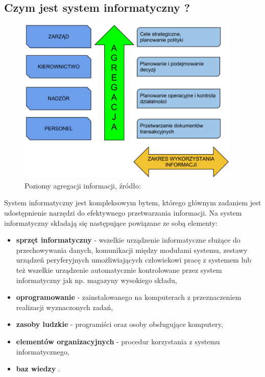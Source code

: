 	\subsection{Czym jest system informatyczny ?}
		\begin{figure}[h]
			\label{c3:information_level_figure}
			\begin{center}
				\includegraphics[width=0.95\textwidth]{images/poziomy_agregacji_informacji}
			\end{center}
			\caption[Poziomy agregacji informacji w systemie informatycznym]{
				Poziomy agregacji informacji, źródło: \cite{IDL}
			}
		\end{figure}	
	
		System informatyczny jest kompleksowym bytem, którego głównym zadaniem jest udostępnienie
		narzędzi do efektywnego przetwarzania informacji. Na system informatyczny składają się
		następujące powiązane ze sobą elementy:
		\begin{itemize}
			\item \textbf{sprzęt informatyczny} - wszelkie urządzenie informatyczne służące
			do przechowywania danych, komunikacji między modułami systemu, zestawy urządzeń
			peryferyjnych umożliwiających człowiekowi pracę z systemem lub też wszelkie urządzenie
			automatycznie kontrolowane przez system informatyczny jak np. magazyny wysokiego składu,
			\item \textbf{oprogramowanie} - zainstalowanego na komputerach z przeznaczeniem realizacji
			wyznaczonych zadań,
			\item \textbf{zasoby ludzkie} - programiści oraz osoby obsługujące komputery,
			\item \textbf{elementów organizacyjnych} - procedur korzystania z systemu informatycznego,
			\item \textbf{baz wiedzy} \cite{logistyka_w_przedsiebiorstwie}.
		\end{itemize}
		
